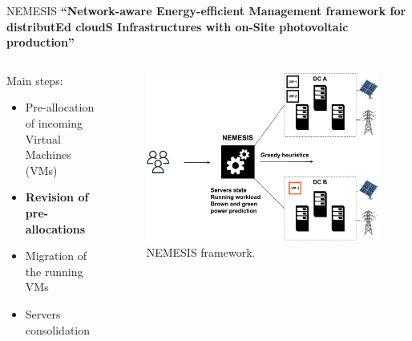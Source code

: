 \documentclass[Ligatures=TeX,table,svgnames,usetotalslideindicator,compress,10pt,aspectratio=169]{beamer}
\begin{document}
\begin{frame}{NEMESIS}
  \textbf {``\alert{N}etwork-aware \alert{E}nergy-efficient
    \alert{M}anagement framework for distribut\alert{E}d
    cloud\alert{S} \alert{I}nfrastructures with on-\alert{S}ite
    photovoltaic production''}  
  \begin{columns}        
    \begin{column}{0.4\textwidth}
Main steps:
\small
\begin{itemize}
    \item Pre-allocation of incoming Virtual Machines (VMs)
    \item \alert{\textbf{Revision of pre-allocations}}
    \item Migration of the running VMs
    \item Servers consolidation
\end{itemize}
\end{column}   

\begin{column}{0.6\textwidth}
      \begin{figure}[!h]
        \centering
        \includegraphics[width=.85\textwidth]{images/nemesis_review_1.pdf}
        \caption{NEMESIS framework.}
      \end{figure}
    \end{column}        

\end{columns}
\end{frame}

\addtocounter{framenumber}{-1}


    
\end{document}
